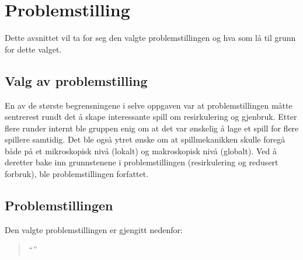 \section{Problemstilling}\label{sec:problemstilling}
Dette avsnittet vil ta for seg den valgte problemstillingen og hva som
lå til grunn for dette valget.
\subsection{Valg av problemstilling}
En av de største begrensningene i selve oppgaven var at
problemstillingen måtte sentrerest rundt det å skape interessante spill
om resirkulering og gjenbruk. Etter flere runder internt ble gruppen
enig om at det var ønskelig å lage et spill for flere spillere samtidig.
Det ble også ytret ønske om at spillmekanikken skulle foregå både på et
mikroskopisk nivå (lokalt) og makroskopisk nivå (globalt). Ved å
deretter bake inn grunnstenene i problemstillingen (resirkulering og
redusert forbruk), ble problemstillingen forfattet.
\subsection{Problemstillingen}\label{sec:problemstillingen}
Den valgte problemstillingen er gjengitt nedenfor:
\begin{quotation}
\large\emph{``''}
\end{quotation}
